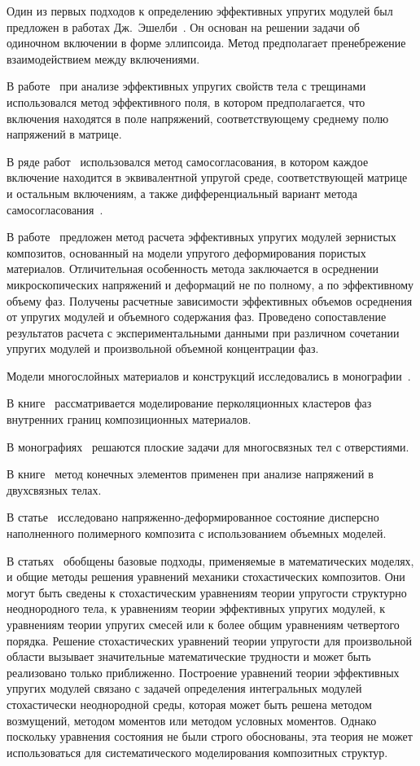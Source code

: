 Один из первых подходов к определению эффективных упругих модулей был предложен в работах Дж.~Эшелби~\cite{Eshelbi, Eshelby}. Он основан на решении задачи об одиночном включении в форме эллипсоида. Метод предполагает пренебрежение взаимодействием между включениями.

В работе~\cite{Kachanov} при анализе эффективных упругих свойств тела с трещинами использовался метод эффективного поля, в котором предполагается, что включения находятся в поле напряжений, соответствующему среднему полю напряжений в матрице.

В ряде работ~\cite{Christensen1990} использовался метод самосогласования, в котором каждое включение находится в эквивалентной упругой среде, соответствующей матрице и остальным включениям, а также дифференциальный вариант метода самосогласования~\cite{Salganik, Vavakin, Zimmerman}.

В работе~\cite{Fedotov} предложен метод расчета эффективных упругих модулей зернистых композитов, основанный на модели упругого деформирования пористых материалов. Отличительная особенность метода заключается в осреднении микроскопических напряжений и деформаций не по полному, а по эффективному объему фаз. Получены расчетные зависимости эффективных объемов осреднения от упругих модулей и объемного содержания фаз. Проведено сопоставление результатов расчета с экспериментальными данными при различном сочетании упругих модулей и произвольной объемной концентрации фаз.

Модели многослойных материалов и конструкций исследовались в монографии~\cite{Bolotin}.

В книге~\cite{Gerega} рассматривается моделирование перколяционных кластеров фаз внутренних границ композиционных материалов.

В монографиях~\cite{Grigoliuk, Savin} решаются плоские задачи для многосвязных тел с отверстиями.

В книге~\cite{Erzhanov} метод конечных элементов применен при анализе напряжений в двухсвязных телах.

В статье~\cite{Zharkov} исследовано напряженно-деформированное состояние дисперсно наполненного полимерного композита с использованием объемных моделей.

В статьях~\cite{Khoroshun2000-1, Khoroshun2000-2, Scalon, Trias} обобщены базовые подходы, применяемые в математических моделях, и общие методы решения уравнений механики стохастических композитов. Они могут быть сведены к стохастическим уравнениям теории упругости структурно неоднородного тела, к уравнениям теории эффективных упругих модулей, к уравнениям теории упругих смесей или к более общим уравнениям четвертого порядка. Решение стохастических уравнений теории упругости для произвольной области вызывает значительные математические трудности и может быть реализовано только приближенно. Построение уравнений теории эффективных упругих модулей связано с задачей определения интегральных модулей стохастически неоднородной среды, которая может быть решена методом возмущений, методом моментов или методом условных моментов. Однако поскольку уравнения состояния не были строго обоснованы, эта теория не может использоваться для систематического моделирования композитных структур.

